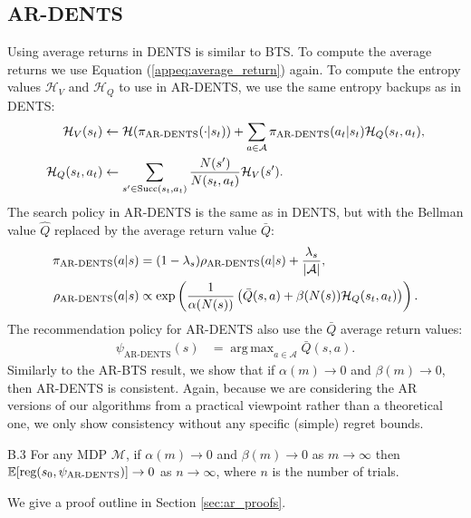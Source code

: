 \documentclass{article}
\newcommand{\bb}[1]{\mathbb{#1}}
\newcommand{\cl}[1]{\mathcal{#1}}
\newcommand{\succc}[2]{\textnormal{Succ}(#1,#2)}
\newcommand{\reg}{\textnormal{reg}}
\DeclareMathOperator*{\argmax}{arg\,max}
\theoremstyle{plain}
\newenvironment{proofoutline}{\proof[Proof outline]}{\endproof}
\begin{document}
\begin{appendices}
    \subsection{AR-DENTS}
        Using average returns in DENTS is similar to BTS. To compute the average returns we use Equation (\ref{appeq:average_return}) again. To compute the entropy values $\cl{H}_V$ and $\cl{H}_Q$ to use in AR-DENTS, we use the same entropy backups as in DENTS:
        \begin{align}
            \cl{H}_V(s_t) &\leftarrow \cl{H}(\pi_{\textnormal{AR-DENTS}}(\cdot | s_t)) + \sum_{a\in\cl{A}} \pi_{\textnormal{AR-DENTS}}(a_t|s_t)\cl{H}_Q(s_t,a_t), \label{appeq:entropy_v} \\
            \cl{H}_Q(s_t,a_t) &\leftarrow \sum_{s'\in \succc{s_t}{a_t}} \frac{N(s')}{N(s_t,a_t)} \cl{H}_V(s'). \label{appeq:entropy_q}
        \end{align}
        The search policy in AR-DENTS is the same as in DENTS, but with the Bellman value $\hat{Q}$ replaced by the average return value $\bar{Q}$:
        \begin{align}
            \pi_{\textnormal{AR-DENTS}}(a|s) &= (1-\lambda_s)\rho_{\textnormal{AR-DENTS}}(a|s) + \frac{\lambda_s}{|\cl{A}|}, \\
            \rho_{\textnormal{AR-DENTS}}(a|s) &\propto \exp\left(\frac{1}{\alpha(N(s))}\left(\bar{Q}(s,a) + \beta(N(s))\cl{H}_Q(s_t,a_t) \right)\right).
        \end{align}
        The recommendation policy for AR-DENTS also use the $\bar{Q}$ average return values:
        \begin{align*}
            \psi_{\text{AR-DENTS}}(s)&=\argmax_{a\in\cl{A}}\bar{Q}(s,a).
        \end{align*}
        Similarly to the AR-BTS result, we show that if $\alpha(m)\rightarrow 0$ and $\beta(m)\rightarrow 0$, then AR-DENTS is consistent. Again, because we are considering the AR versions of our algorithms from a practical viewpoint rather than a theoretical one, we only show consistency without any specific (simple) regret bounds.

        \begin{customthm}{B.3} \label{thrm:ar_dents}
            For any MDP $\cl{M}$, if $\alpha(m)\rightarrow 0$ and $\beta(m)\rightarrow 0$ as $m\rightarrow\infty$ then $\bb{E}[\reg(s_0,\psi_{\textnormal{AR-DENTS}})]\rightarrow 0$ as $n\rightarrow\infty$, where $n$ is the number of trials.
        \end{customthm}
        \begin{proofoutline}
            We give a proof outline in Section \ref{sec:ar_proofs}.
        \end{proofoutline}
        


\end{appendices}
\end{document}

